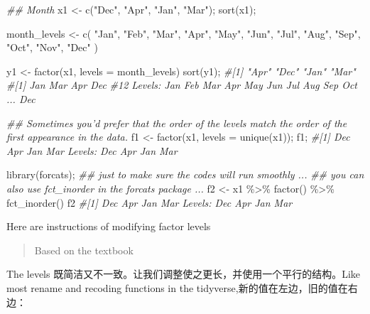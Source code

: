 \documentclass[
]{article}
\newenvironment{Shaded}{}{}
\newcommand{\AttributeTok}[1]{\textcolor[rgb]{0.49,0.56,0.16}{#1}}
\newcommand{\CommentTok}[1]{\textcolor[rgb]{0.38,0.63,0.69}{\textit{#1}}}
\newcommand{\DocumentationTok}[1]{\textcolor[rgb]{0.73,0.13,0.13}{\textit{#1}}}
\newcommand{\FunctionTok}[1]{\textcolor[rgb]{0.02,0.16,0.49}{#1}}
\newcommand{\NormalTok}[1]{#1}
\newcommand{\OtherTok}[1]{\textcolor[rgb]{0.00,0.44,0.13}{#1}}
\newcommand{\SpecialCharTok}[1]{\textcolor[rgb]{0.25,0.44,0.63}{#1}}
\newcommand{\StringTok}[1]{\textcolor[rgb]{0.25,0.44,0.63}{#1}}
\begin{document}
\begin{Shaded}
\begin{Highlighting}[]
\DocumentationTok{\#\# Month}
\NormalTok{x1 }\OtherTok{\textless{}{-}} \FunctionTok{c}\NormalTok{(}\StringTok{"Dec"}\NormalTok{, }\StringTok{"Apr"}\NormalTok{, }\StringTok{"Jan"}\NormalTok{, }\StringTok{"Mar"}\NormalTok{);}
\FunctionTok{sort}\NormalTok{(x1);}

\NormalTok{month\_levels }\OtherTok{\textless{}{-}} \FunctionTok{c}\NormalTok{(}
  \StringTok{"Jan"}\NormalTok{, }\StringTok{"Feb"}\NormalTok{, }\StringTok{"Mar"}\NormalTok{, }\StringTok{"Apr"}\NormalTok{, }\StringTok{"May"}\NormalTok{, }\StringTok{"Jun"}\NormalTok{, }
  \StringTok{"Jul"}\NormalTok{, }\StringTok{"Aug"}\NormalTok{, }\StringTok{"Sep"}\NormalTok{, }\StringTok{"Oct"}\NormalTok{, }\StringTok{"Nov"}\NormalTok{, }\StringTok{"Dec"}
\NormalTok{)}

\NormalTok{y1 }\OtherTok{\textless{}{-}} \FunctionTok{factor}\NormalTok{(x1, }\AttributeTok{levels =}\NormalTok{ month\_levels)}
\FunctionTok{sort}\NormalTok{(y1);}
\CommentTok{\#[1] "Apr" "Dec" "Jan" "Mar"}
\CommentTok{\#[1] Jan Mar Apr Dec}
\CommentTok{\#12 Levels: Jan Feb Mar Apr May Jun Jul Aug Sep Oct ... Dec}

\DocumentationTok{\#\# Sometimes you’d prefer that the order of the levels match the order of the first appearance in the data.}
\NormalTok{f1 }\OtherTok{\textless{}{-}} \FunctionTok{factor}\NormalTok{(x1, }\AttributeTok{levels =} \FunctionTok{unique}\NormalTok{(x1));}
\NormalTok{f1;}
\CommentTok{\#[1] Dec Apr Jan Mar Levels: Dec Apr Jan Mar}

\FunctionTok{library}\NormalTok{(forcats); }\DocumentationTok{\#\# just to make sure the codes will run smoothly ... }
\DocumentationTok{\#\# you can also use fct\_inorder in the forcats package ...}
\NormalTok{f2 }\OtherTok{\textless{}{-}}\NormalTok{ x1 }\SpecialCharTok{\%\textgreater{}\%} \FunctionTok{factor}\NormalTok{() }\SpecialCharTok{\%\textgreater{}\%} \FunctionTok{fct\_inorder}\NormalTok{()}
\NormalTok{f2}
\CommentTok{\#[1] Dec Apr Jan Mar Levels: Dec Apr Jan Mar}
\end{Highlighting}
\end{Shaded}

Here are instructions of modifying factor levels

\begin{quote}
Based on the textbook
\end{quote}

The levels
既简洁又不一致。让我们调整使之更长，并使用一个平行的结构。Like most
rename and recoding functions in the
tidyverse,新的值在左边，旧的值在右边：
\end{document}
